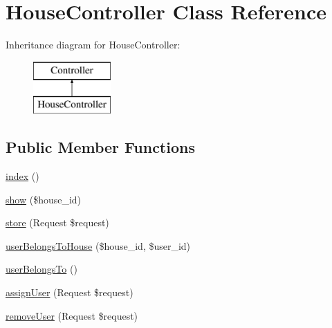 \hypertarget{class_app_1_1_http_1_1_controllers_1_1_a_p_i_1_1_house_controller}{}\section{House\+Controller Class Reference}
\label{class_app_1_1_http_1_1_controllers_1_1_a_p_i_1_1_house_controller}
Inheritance diagram for House\+Controller\+:\begin{figure}[H]
\begin{center}
\leavevmode
\includegraphics[height=2.000000cm]{class_app_1_1_http_1_1_controllers_1_1_a_p_i_1_1_house_controller}
\end{center}
\end{figure}
\subsection*{Public Member Functions}
\begin{DoxyCompactItemize}
\item 
\mbox{\hyperlink{class_app_1_1_http_1_1_controllers_1_1_a_p_i_1_1_house_controller_a149eb92716c1084a935e04a8d95f7347}{index}} ()
\item 
\mbox{\hyperlink{class_app_1_1_http_1_1_controllers_1_1_a_p_i_1_1_house_controller_ac20790a51d9718bb438c19b75e2eee04}{show}} (\$house\+\_\+id)
\item 
\mbox{\hyperlink{class_app_1_1_http_1_1_controllers_1_1_a_p_i_1_1_house_controller_a9ef485163104597c12185b53cdacf638}{store}} (Request \$request)
\item 
\mbox{\hyperlink{class_app_1_1_http_1_1_controllers_1_1_a_p_i_1_1_house_controller_a1670966539eb987735afdd185d916059}{user\+Belongs\+To\+House}} (\$house\+\_\+id, \$user\+\_\+id)
\item 
\mbox{\hyperlink{class_app_1_1_http_1_1_controllers_1_1_a_p_i_1_1_house_controller_afe29028f90f104632e42e82a462983d2}{user\+Belongs\+To}} ()
\item 
\mbox{\hyperlink{class_app_1_1_http_1_1_controllers_1_1_a_p_i_1_1_house_controller_a755a44e4534f0223d8efff42766142e5}{assign\+User}} (Request \$request)
\item 
\mbox{\hyperlink{class_app_1_1_http_1_1_controllers_1_1_a_p_i_1_1_house_controller_a671ce7d20d53b83d30844e966019f9b3}{remove\+User}} (Request \$request)
\end{DoxyCompactItemize}
